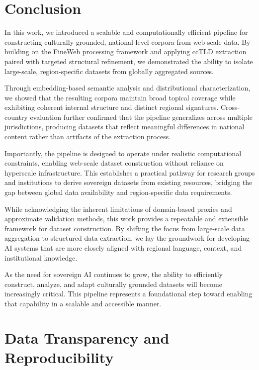 \documentclass[11pt, a4paper]{article}
\begin{document}
\section{Conclusion}

In this work, we introduced a scalable and computationally efficient pipeline for constructing culturally grounded, national-level corpora from web-scale data. By building on the FineWeb processing framework and applying ccTLD extraction paired with targeted structural refinement, we demonstrated the ability to isolate large-scale, region-specific datasets from globally aggregated sources.

Through embedding-based semantic analysis and distributional characterization, we showed that the resulting corpora maintain broad topical coverage while exhibiting coherent internal structure and distinct regional signatures. Cross-country evaluation further confirmed that the pipeline generalizes across multiple jurisdictions, producing datasets that reflect meaningful differences in national content rather than artifacts of the extraction process.

Importantly, the pipeline is designed to operate under realistic computational constraints, enabling web-scale dataset construction without reliance on hyperscale infrastructure. This establishes a practical pathway for research groups and institutions to derive sovereign datasets from existing resources, bridging the gap between global data availability and region-specific data requirements.

While acknowledging the inherent limitations of domain-based proxies and approximate validation methods, this work provides a repeatable and extensible framework for dataset construction. By shifting the focus from large-scale data aggregation to structured data extraction, we lay the groundwork for developing AI systems that are more closely aligned with regional language, context, and institutional knowledge.

As the need for sovereign AI continues to grow, the ability to efficiently construct, analyze, and adapt culturally grounded datasets will become increasingly critical. This pipeline represents a foundational step toward enabling that capability in a scalable and accessible manner.

\section{Data Transparency and Reproducibility}
\end{document}
